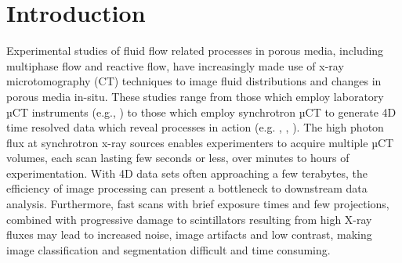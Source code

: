 \documentclass[draft,linenumbers]{agujournal2018}
\begin{document}
%
%

%


%
%
%
%
\section{Introduction}
Experimental studies of fluid flow related processes in porous media, including multiphase flow and reactive flow, have increasingly made use of x-ray microtomography (\textmu CT) techniques to image fluid distributions and changes in porous media in-situ. These studies range from those which employ laboratory µCT instruments (e.g.\citet{pak2015droplet}, \citet{alratrout2018wettability}) to those which employ synchrotron µCT to generate 4D time resolved data which reveal processes in action (e.g. \citet{berg2014multiphase}, \citet{reynolds2017dynamic}, \citet{berg2013real}). The high photon flux at synchrotron x-ray sources enables experimenters to acquire multiple µCT volumes, each scan lasting few seconds or less, over minutes to hours of experimentation. With 4D data sets often approaching a few terabytes, the efficiency of image processing can present a bottleneck to downstream data analysis. Furthermore, fast scans with brief exposure times and few projections, combined with progressive damage to scintillators resulting from high X-ray fluxes may lead to increased noise, image artifacts and low contrast, making image classification and segmentation difficult and time consuming.
\end{document}
